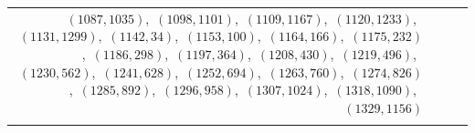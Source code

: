 \documentclass[11pt]{article}
\begin{document}
\begin{longtable}{@{}rrl>{\raggedright\arraybackslash}p{}@{}}
$(1087,1035)$,\allowbreak\ $(1098,1101)$,\allowbreak\ $(1109,1167)$,\allowbreak\ $(1120,1233)$,\allowbreak\ $(1131,1299)$,\allowbreak\ $(1142,34)$,\allowbreak\ $(1153,100)$,\allowbreak\ $(1164,166)$,\allowbreak\ $(1175,232)$,\allowbreak\ $(1186,298)$,\allowbreak\ $(1197,364)$,\allowbreak\ $(1208,430)$,\allowbreak\ $(1219,496)$,\allowbreak\ $(1230,562)$,\allowbreak\ $(1241,628)$,\allowbreak\ $(1252,694)$,\allowbreak\ $(1263,760)$,\allowbreak\ $(1274,826)$,\allowbreak\ $(1285,892)$,\allowbreak\ $(1296,958)$,\allowbreak\ $(1307,1024)$,\allowbreak\ $(1318,1090)$,\allowbreak\ $(1329,1156)$\\
\addlinespace[3pt]
\end{longtable}
\endgroup
\end{document}
